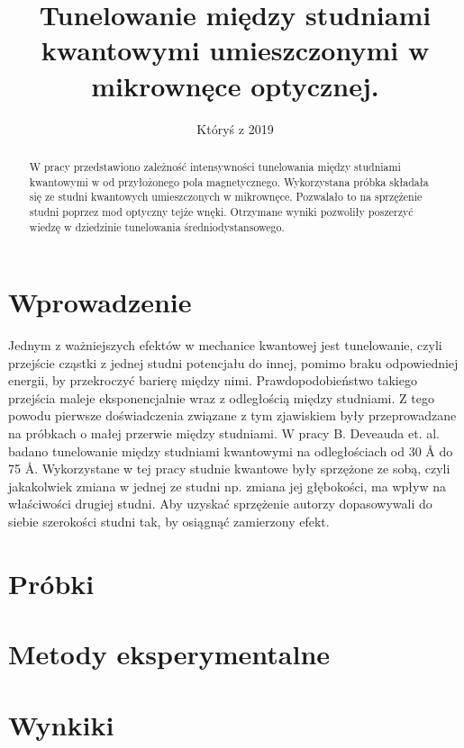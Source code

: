\documentclass[licencjacka]{pracamgr}
\title{Tunelowanie między studniami kwantowymi umieszczonymi w mikrownęce optycznej.}
\date{Któryś z 2019}
\begin{document}
\maketitle

\begin{abstract}
  W pracy przedstawiono zależność intensywności tunelowania między studniami kwantowymi w od przyłożonego pola magnetycznego. Wykorzystana próbka składała się ze studni kwantowych umieszczonych w mikrownęce. Pozwalało to na sprzężenie studni poprzez mod optyczny tejże wnęki. Otrzymane wyniki pozwoliły poszerzyć wiedzę w dziedzinie tunelowania średniodystansowego.
\end{abstract}

\tableofcontents

\chapter*{Wprowadzenie}
Jednym z ważniejszych efektów w mechanice kwantowej jest tunelowanie, czyli przejście cząstki z jednej studni potencjału do innej, pomimo braku odpowiedniej energii, by przekroczyć barierę między nimi. Prawdopodobieństwo takiego przejścia maleje eksponencjalnie wraz z odległością między studniami. Z tego powodu pierwsze doświadczenia związane z tym zjawiskiem były przeprowadzane na próbkach o małej przerwie między studniami. W pracy B. Deveauda et. al. \cite{1990} badano tunelowanie między studniami kwantowymi na odległościach od 30 \r{A} do 75 \r{A}. Wykorzystane w tej pracy studnie kwantowe były sprzężone ze sobą, czyli jakakolwiek zmiana w jednej ze studni np. zmiana jej głębokości, ma wpływ na właściwości drugiej studni. Aby uzyskać sprzężenie autorzy dopasowywali do siebie szerokości studni tak, by osiągnąć zamierzony efekt. 

\chapter{Próbki}\label{r:probki}



\chapter{Metody eksperymentalne}\label{r:metody}



\chapter{Wynkiki}\label{r:wyniki}
\end{document}
